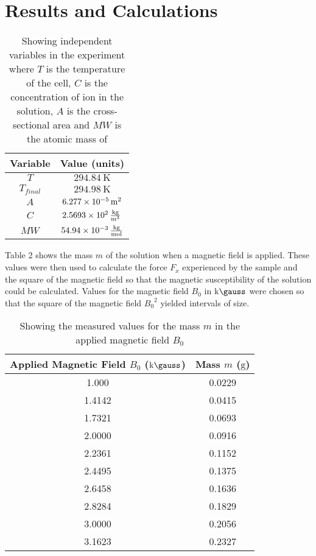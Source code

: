 \documentclass[a4paper,11pt]{article}
\begin{document}
\clearpage

\section{Results and Calculations}

\begin{table}[ht!]
\centering
\begin{tabular}{|c|c|}
\hline
Variable	& Value (units)	\\
\hline
$T$			& $\SI{294.84}{\kelvin}$	\\
$T_{final}$	& $\SI{294.98}{\kelvin}$	\\
$A$			& $\SI{6.277d-5}{\square\meter}$	\\
$C$			& $\SI{2.5693d2}{\kilogram\per\cubic\meter}$	\\
$MW$		& $\SI{54.94d-3}{\kilogram\per\mole}$		\\
\hline
\end{tabular}
\caption{Showing independent variables in the experiment where $T$ is the temperature of the cell, $C$ is the concentration of  ion in the solution, $A$ is the cross-sectional area and $MW$ is the atomic mass of }
\end{table}

Table 2 shows the mass $m$ of the solution when a magnetic field is applied. These values were then used to calculate the force  $F_x$ experienced by the sample and the square of the magnetic field so that the magnetic susceptibility of the solution could be calculated. Values for the magnetic field $B_0$ in $\si{\kilo\gauss}$ were chosen so that the square of the magnetic field ${B_0}^2$ yielded intervals of size. 

\begin{table}[ht!]
\centering
\begin{tabular}{|c|c|}
\hline
Applied Magnetic Field $B_0$ ($\si{\kilo\gauss}$)	& Mass $m$ ($\si{\gram}$)	\\
\hline
1.000		& 0.0229	\\
1.4142		& 0.0415	\\
1.7321		& 0.0693	\\
2.0000		& 0.0916	\\
2.2361		& 0.1152	\\
2.4495		& 0.1375	\\
2.6458		& 0.1636	\\
2.8284		& 0.1829	\\
3.0000		& 0.2056	\\
3.1623		& 0.2327	\\
\hline
\end{tabular}
\caption{Showing the measured values for the mass $m$ in the applied magnetic field $B_0$ }
\end{table}
\end{document}
